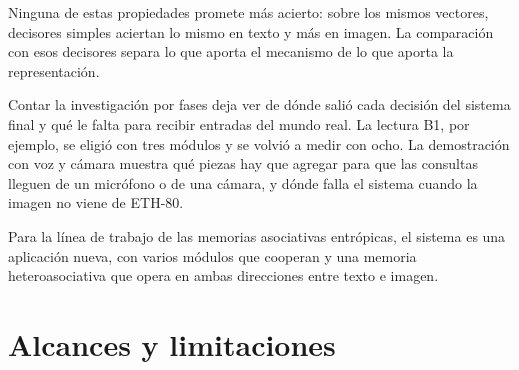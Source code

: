 Ninguna de estas propiedades promete más acierto: sobre los mismos vectores, decisores
simples aciertan lo mismo en texto y más en imagen.
La comparación con esos decisores separa lo que aporta el mecanismo de lo que aporta la
representación.

Contar la investigación por fases deja ver de dónde salió cada decisión del sistema
final y qué le falta para recibir entradas del mundo real.
La lectura B1, por ejemplo, se eligió con tres módulos y se volvió a medir con ocho.
La demostración con voz y cámara muestra qué piezas hay que agregar para que las
consultas lleguen de un micrófono o de una cámara, y dónde falla el sistema cuando la
imagen no viene de ETH-80.

Para la línea de trabajo de las memorias asociativas entrópicas, el sistema es una
aplicación nueva, con varios módulos que cooperan y una memoria heteroasociativa que
opera en ambas direcciones entre texto e imagen.

\section{Alcances y limitaciones}

